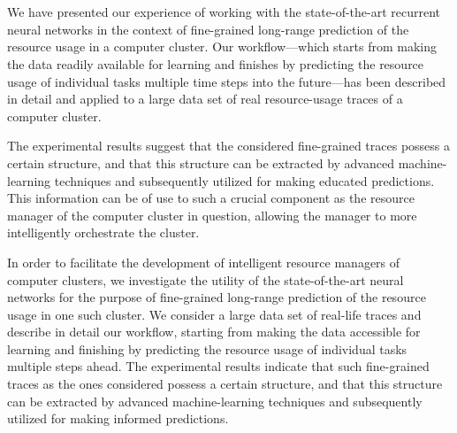 \section{\conclusiontitle}

We have presented our experience of working with the state-of-the-art recurrent
neural networks in the context of fine-grained long-range prediction of the
resource usage in a computer cluster. Our workflow---which starts from making
the data readily available for learning and finishes by predicting the resource
usage of individual tasks multiple time steps into the future---has been
described in detail and applied to a large data set of real resource-usage
traces of a computer cluster.

The experimental results suggest that the considered fine-grained traces possess
a certain structure, and that this structure can be extracted by advanced
machine-learning techniques and subsequently utilized for making educated
predictions. This information can be of use to such a crucial component as the
resource manager of the computer cluster in question, allowing the manager to
more intelligently orchestrate the cluster.

In order to facilitate the development of intelligent resource managers of
computer clusters, we investigate the utility of the state-of-the-art neural
networks for the purpose of fine-grained long-range prediction of the resource
usage in one such cluster. We consider a large data set of real-life traces and
describe in detail our workflow, starting from making the data accessible for
learning and finishing by predicting the resource usage of individual tasks
multiple steps ahead. The experimental results indicate that such fine-grained
traces as the ones considered possess a certain structure, and that this
structure can be extracted by advanced machine-learning techniques and
subsequently utilized for making informed predictions.
